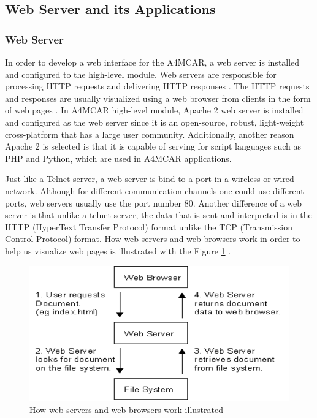 \subsection{Web Server and its Applications}
\subsubsection{Web Server}
In order to develop a web interface for the A4MCAR, a web server is installed and configured to the high-level module. Web servers are responsible for processing HTTP requests and delivering HTTP responses \cite{apacheguide}. The HTTP requests and responses are usually visualized using a web browser from clients in the form of web pages \cite{apacheguide}. In A4MCAR high-level module, Apache 2 web server is installed and configured as the web server since it is an open-source, robust, light-weight cross-platform that has a large user community. Additionally, another reason Apache 2 is selected is that it is capable of serving for script languages such as PHP and Python, which are used in A4MCAR applications.

Just like a Telnet server, a web server is bind to a port in a wireless or wired network. Although for different communication channels one could use different ports, web servers usually use the port number 80. Another difference of a web server is that unlike a telnet server, the data that is sent and interpreted is in the HTTP (HyperText Transfer Protocol) \cite{webserver} format unlike the TCP (Transmission Control Protocol) format. How web servers and web browsers work in order to help us visualize web pages is illustrated with the Figure \ref{fig:webserver} \cite{webserver}. \\

\begin{figure}[!ht]
	\includegraphics[scale=0.5]{content/images/webserver.png}
	\caption{How web servers and web browsers work illustrated \cite{webserver}}
	\label{fig:webserver}
\end{figure}

